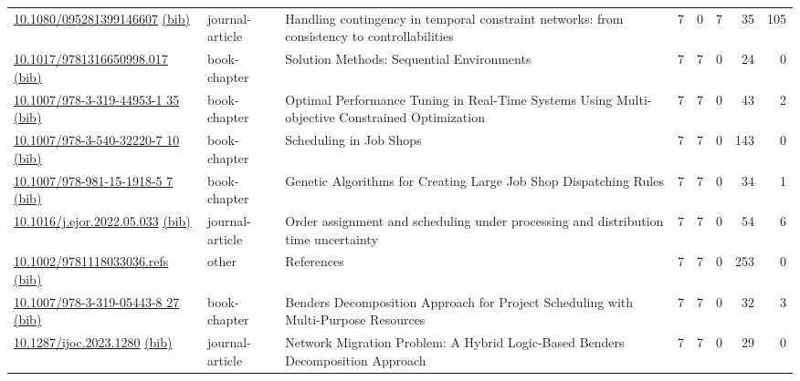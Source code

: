 {\begin{longtable}{p{5cm}lp{11cm}rrrrr}
\href{http://dx.doi.org/10.1080/095281399146607}{10.1080/095281399146607} \href{https://www.doi2bib.org/bib/10.1080/095281399146607}{(bib)} & journal-article & Handling contingency in temporal constraint networks: from consistency to controllabilities & 7 & 0 & 7 & 35 & 105 \\
\href{http://dx.doi.org/10.1017/9781316650998.017}{10.1017/9781316650998.017} \href{https://www.doi2bib.org/bib/10.1017/9781316650998.017}{(bib)} & book-chapter & Solution Methods: Sequential Environments & 7 & 7 & 0 & 24 & 0 \\
\href{http://dx.doi.org/10.1007/978-3-319-44953-1_35}{10.1007/978-3-319-44953-1 35} \href{https://www.doi2bib.org/bib/10.1007/978-3-319-44953-1_35}{(bib)} & book-chapter & Optimal Performance Tuning in Real-Time Systems Using Multi-objective Constrained Optimization & 7 & 7 & 0 & 43 & 2 \\
\href{http://dx.doi.org/10.1007/978-3-540-32220-7_10}{10.1007/978-3-540-32220-7 10} \href{https://www.doi2bib.org/bib/10.1007/978-3-540-32220-7_10}{(bib)} & book-chapter & Scheduling in Job Shops & 7 & 7 & 0 & 143 & 0 \\
\href{http://dx.doi.org/10.1007/978-981-15-1918-5_7}{10.1007/978-981-15-1918-5 7} \href{https://www.doi2bib.org/bib/10.1007/978-981-15-1918-5_7}{(bib)} & book-chapter & Genetic Algorithms for Creating Large Job Shop Dispatching Rules & 7 & 7 & 0 & 34 & 1 \\
\href{http://dx.doi.org/10.1016/j.ejor.2022.05.033}{10.1016/j.ejor.2022.05.033} \href{https://www.doi2bib.org/bib/10.1016/j.ejor.2022.05.033}{(bib)} & journal-article & Order assignment and scheduling under processing and distribution time uncertainty & 7 & 7 & 0 & 54 & 6 \\
\href{http://dx.doi.org/10.1002/9781118033036.refs}{10.1002/9781118033036.refs} \href{https://www.doi2bib.org/bib/10.1002/9781118033036.refs}{(bib)} & other & References & 7 & 7 & 0 & 253 & 0 \\
\href{http://dx.doi.org/10.1007/978-3-319-05443-8_27}{10.1007/978-3-319-05443-8 27} \href{https://www.doi2bib.org/bib/10.1007/978-3-319-05443-8_27}{(bib)} & book-chapter & Benders Decomposition Approach for Project Scheduling with Multi-Purpose Resources & 7 & 7 & 0 & 32 & 3 \\
\href{http://dx.doi.org/10.1287/ijoc.2023.1280}{10.1287/ijoc.2023.1280} \href{https://www.doi2bib.org/bib/10.1287/ijoc.2023.1280}{(bib)} & journal-article & Network Migration Problem: A Hybrid Logic-Based Benders Decomposition Approach & 7 & 7 & 0 & 29 & 0 \\

\end{longtable}}
